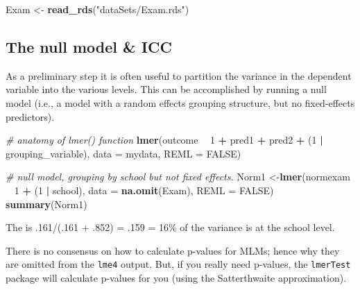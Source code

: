 \documentclass[]{book}
\newenvironment{Shaded}{\begin{snugshade}}{\end{snugshade}}
\newcommand{\KeywordTok}[1]{\textcolor[rgb]{0.13,0.29,0.53}{\textbf{#1}}}
\newcommand{\DataTypeTok}[1]{\textcolor[rgb]{0.13,0.29,0.53}{#1}}
\newcommand{\DecValTok}[1]{\textcolor[rgb]{0.00,0.00,0.81}{#1}}
\newcommand{\StringTok}[1]{\textcolor[rgb]{0.31,0.60,0.02}{#1}}
\newcommand{\CommentTok}[1]{\textcolor[rgb]{0.56,0.35,0.01}{\textit{#1}}}
\newcommand{\OtherTok}[1]{\textcolor[rgb]{0.56,0.35,0.01}{#1}}
\newcommand{\OperatorTok}[1]{\textcolor[rgb]{0.81,0.36,0.00}{\textbf{#1}}}
\newcommand{\NormalTok}[1]{#1}
\begin{document}
\begin{Shaded}
\begin{Highlighting}[]
\NormalTok{  Exam <-}\StringTok{ }\KeywordTok{read_rds}\NormalTok{(}\StringTok{"dataSets/Exam.rds"}\NormalTok{)}
\end{Highlighting}
\end{Shaded}

\subsection{The null model \& ICC}\label{the-null-model-icc}

As a preliminary step it is often useful to partition the variance in
the dependent variable into the various levels. This can be accomplished
by running a null model (i.e., a model with a random effects grouping
structure, but no fixed-effects predictors).

\begin{Shaded}
\begin{Highlighting}[]
  \CommentTok{# anatomy of lmer() function}
  \KeywordTok{lmer}\NormalTok{(outcome }\OperatorTok{~}\StringTok{ }\DecValTok{1} \OperatorTok{+}\StringTok{ }\NormalTok{pred1 }\OperatorTok{+}\StringTok{ }\NormalTok{pred2 }\OperatorTok{+}\StringTok{ }\NormalTok{(}\DecValTok{1} \OperatorTok{|}\StringTok{ }\NormalTok{grouping_variable), }
       \DataTypeTok{data =}\NormalTok{ mydata, }
       \DataTypeTok{REML =} \OtherTok{FALSE}\NormalTok{)}
\end{Highlighting}
\end{Shaded}

\begin{Shaded}
\begin{Highlighting}[]
  \CommentTok{# null model, grouping by school but not fixed effects.}
\NormalTok{  Norm1 <-}\KeywordTok{lmer}\NormalTok{(normexam }\OperatorTok{~}\StringTok{ }\DecValTok{1} \OperatorTok{+}\StringTok{ }\NormalTok{(}\DecValTok{1} \OperatorTok{|}\StringTok{ }\NormalTok{school), }
              \DataTypeTok{data =} \KeywordTok{na.omit}\NormalTok{(Exam), }\DataTypeTok{REML =} \OtherTok{FALSE}\NormalTok{)}
  \KeywordTok{summary}\NormalTok{(Norm1)}
\end{Highlighting}
\end{Shaded}

The is .161/(.161 + .852) = .159 = 16\% of the variance is at the school
level.

There is no consensus on how to calculate p-values for MLMs; hence why
they are omitted from the \texttt{lme4} output. But, if you really need
p-values, the \texttt{lmerTest} package will calculate p-values for you
(using the Satterthwaite approximation).
\end{document}
